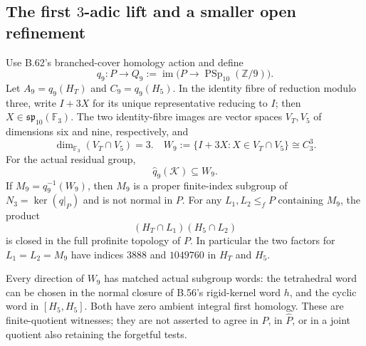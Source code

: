 \subsection*{The first $3$-adic lift and a smaller open refinement}

Use B.62's branched-cover homology action and define
\[
 q_9:P\longrightarrow Q_9
 :=\operatorname{im}\bigl(P\longrightarrow
          \operatorname{PSp}_{10}(\mathbb Z/9)\bigr).
                                                               \tag{B.63.1}
\]
Let $A_9=q_9(H_T)$ and $C_9=q_9(H_5)$.
In the identity fibre of reduction modulo three, write
$I+3X$ for its unique representative reducing to $I$;
then $X\in\mathfrak{sp}_{10}(\mathbb F_3)$.
The two identity-fibre images are vector spaces
$V_T,V_5$ of dimensions six and nine, respectively,
and
\[
 \dim_{\mathbb F_3}(V_T\cap V_5)=3.
 \quad
 W_9:=\{I+3X:X\in V_T\cap V_5\}\cong C_3^3.                 \tag{B.63.2}
\]
For the actual residual group,
\[
            \widehat q_9(\mathcal K)\subseteq W_9.            \tag{B.63.3}
\]
If $M_9=q_9^{-1}(W_9)$, then $M_9$ is a proper finite-index
subgroup of $N_3=\ker(q|_P)$ and is not normal in $P$.
For any $L_1,L_2\leq_f P$ containing $M_9$, the product
\[
                   (H_T\cap L_1)(H_5\cap L_2)               \tag{B.63.4}
\]
is closed in the full profinite topology of $P$.
In particular the two factors for $L_1=L_2=M_9$ have indices
$3888$ and $1049760$ in $H_T$ and $H_5$.

Every direction of $W_9$ has matched actual subgroup words:
the tetrahedral word can be chosen in the normal closure
of B.56's rigid-kernel word $h$, and the cyclic word in
$[H_5,H_5]$.  Both have zero ambient integral first homology.
These are finite-quotient witnesses; they are not asserted
to agree in $P$, in $\widehat P$, or in a joint quotient
also retaining the forgetful tests.


